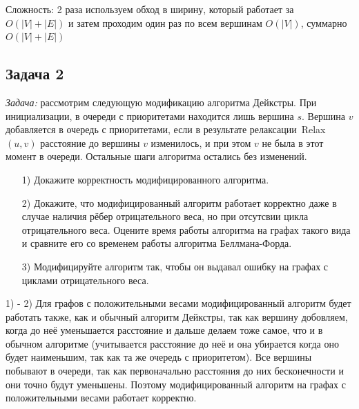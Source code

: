 \documentclass[a4paper,12pt]{article} %
\begin{document}
Сложность: 2 раза используем обход в ширину, который работает за $ O(|V|+|E|) $ и затем проходим один раз по всем вершинам $ O(|V|) $, суммарно $ O(|V|+|E|)$

\subsection*{Задача 2}
\textit{Задача:} рассмотрим следующую модификацию алгоритма Дейкстры. При инициализации, в очереди с приоритетами находится лишь вершина $s$. Вершина $v$ добавляется в очередь с приоритетами, если в результате релаксации~Relax$(u,v)$ расстояние до вершины $v$ изменилось, и при этом $v$ не была в этот момент в очереди. Остальные шаги алгоритма остались без изменений.
\begin{itemize}
\item[1) ] Докажите корректность модифицированного алгоритма. 
\item[2) ] Докажите, что модифицированный алгоритм работает корректно даже в случае наличия рёбер отрицательного веса, но при отсутсвии цикла отрицательного веса. Оцените время работы алгоритма на графах такого вида и сравните его со временем работы алгоритма Беллмана-Форда.
\item[3) ] Модифицируйте алгоритм так, чтобы он выдавал ошибку на графах с циклами отрицательного веса.\\
\end{itemize}

1) - 2) Для графов с положительными весами модифицированный алгоритм будет работать также, как и обычный алгоритм Дейкстры, так как вершину добовляем, когда до неё уменьшается расстояние и дальше делаем тоже самое, что и в обычном алгоритме (учитывается расстояние до неё и она убирается когда оно будет наименьшим, так как та же очередь с приоритетом). Все вершины побывают в очереди, так как первоначально расстояния до них бесконечности и они точно будут уменьшены. Поэтому модифицированный алгоритм на графах с положительными весами работает корректно.\\
\end{document}

